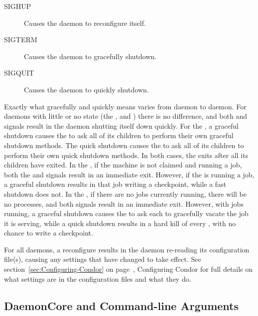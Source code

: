 \begin{description}
\item[SIGHUP] Causes the daemon to reconfigure itself.
\item[SIGTERM] Causes the daemon to gracefully shutdown.
\item[SIGQUIT] Causes the daemon to quickly shutdown.
\end{description}

Exactly what gracefully and quickly means varies from daemon
to daemon.  For daemons with little or no state 
(the ,  and )
there is no difference, and both  and  signals
result in the daemon shutting itself down quickly.
For the ,
a graceful shutdown causes the  to ask all of 
its children to perform their own graceful shutdown methods.
The quick shutdown causes the  to ask all of 
its children to perform their own quick shutdown methods.
In both cases, the  exits after all its children have exited.
In the , if the machine is not claimed and running a job, 
both the  and  signals result in an immediate exit.
However, if the  is running a job,
a graceful shutdown results in that job writing a checkpoint,
while a fast shutdown does not.
In the , if there are no jobs currently running,
there will be no  processes,
and both signals result in an immediate exit.
However, with jobs running, a graceful shutdown causes
the  to ask each  to gracefully vacate
the job it is serving, 
while a quick shutdown results in a hard kill of every ,
with no chance to write a checkpoint.  

For all daemons, a reconfigure results in the daemon re-reading
its configuration file(s), causing any settings that have changed
to take effect.
See section~\ref{sec:Configuring-Condor} on
page~\pageref{sec:Configuring-Condor}, Configuring Condor for full
details on what settings are in the configuration files and what they do.

\subsection{\label{sec:DaemonCore-Arguments}DaemonCore and
Command-line Arguments} 

